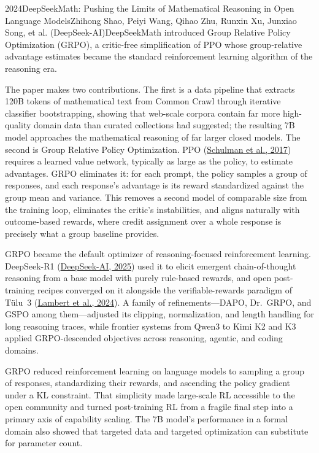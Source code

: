 
\begin{papersummary}{2024}{DeepSeekMath: Pushing the Limits of Mathematical Reasoning in Open Language Models}{Zhihong Shao, Peiyi Wang, Qihao Zhu, Runxin Xu, Junxiao Song, et al. (DeepSeek-AI)}{DeepSeekMath introduced Group Relative Policy Optimization (GRPO), a critic-free simplification of PPO whose group-relative advantage estimates became the standard reinforcement learning algorithm of the reasoning era.}

The paper makes two contributions. The first is a data pipeline that extracts 120B tokens of mathematical text from Common Crawl through iterative classifier bootstrapping, showing that web-scale corpora contain far more high-quality domain data than curated collections had suggested; the resulting 7B model approaches the mathematical reasoning of far larger closed models. The second is Group Relative Policy Optimization. PPO (\hyperref[paper:schulman-2017-ppo]{Schulman et al., 2017}) requires a learned value network, typically as large as the policy, to estimate advantages. GRPO eliminates it: for each prompt, the policy samples a group of responses, and each response's advantage is its reward standardized against the group mean and variance. This removes a second model of comparable size from the training loop, eliminates the critic's instabilities, and aligns naturally with outcome-based rewards, where credit assignment over a whole response is precisely what a group baseline provides.

GRPO became the default optimizer of reasoning-focused reinforcement learning. DeepSeek-R1 (\hyperref[paper:deepseek-2025-r1]{DeepSeek-AI, 2025}) used it to elicit emergent chain-of-thought reasoning from a base model with purely rule-based rewards, and open post-training recipes converged on it alongside the verifiable-rewards paradigm of T\"ulu~3 (\hyperref[paper:lambert-2024-tulu3]{Lambert et al., 2024}). A family of refinements---DAPO, Dr.~GRPO, and GSPO among them---adjusted its clipping, normalization, and length handling for long reasoning traces, while frontier systems from Qwen3 to Kimi K2 and K3 applied GRPO-descended objectives across reasoning, agentic, and coding domains.

GRPO reduced reinforcement learning on language models to sampling a group of responses, standardizing their rewards, and ascending the policy gradient under a KL constraint. That simplicity made large-scale RL accessible to the open community and turned post-training RL from a fragile final step into a primary axis of capability scaling. The 7B model's performance in a formal domain also showed that targeted data and targeted optimization can substitute for parameter count.

\end{papersummary}
